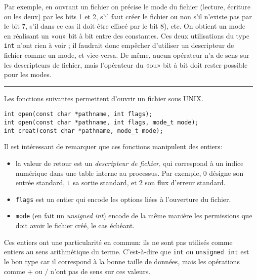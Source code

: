 \def\tBits{\textsc{Bits}\xspace}

Par exemple, en ouvrant un fichier on précise le mode du fichier (lecture,
écriture ou les deux) par les bits 1 et 2, s'il faut créer le fichier ou non
s'il n'existe pas par le bit 7, s'il dans ce cas il doit être effacé par le bit
8), etc. On obtient un mode en réalisant un «ou» bit à bit entre des
constantes. Ces deux utilisations du type \texttt{int} n'ont rien à voir ; il
faudrait donc empêcher d'utiliser un descripteur de fichier comme un mode, et
vice-versa. De même, aucun opérateur n'a de sens sur les descripteurs de
fichier, mais l'opérateur \texttt{\textbar{}} du «ou» bit à bit doit rester
possible pour les modes.

\begin{center}\rule{3in}{0.4pt}\end{center}

Les fonctions suivantes permettent d'ouvrir un fichier sous UNIX.

\begin{verbatim}
int open(const char *pathname, int flags);
int open(const char *pathname, int flags, mode_t mode);
int creat(const char *pathname, mode_t mode);
\end{verbatim}

Il est intéressant de remarquer que ces fonctions manipulent des entiers:

\begin{itemize}

\item la valeur de retour est un \emph{descripteur de fichier}, qui correspond à
un indice numérique dans une table interne au processus. Par exemple, $0$
désigne son entrée standard, $1$ sa sortie standard, et $2$ son flux d'erreur
standard.

\item \texttt{flags} est un entier qui encode les options liées à l'ouverture du
fichier.

\item \texttt{mode} (en fait un \emph{unsigned int}) encode de la même manière
les permissions que doit avoir le fichier créé, le cas échéant.

\end{itemize}

Ces entiers ont une particularité en commun: ils ne sont pas utilisés comme
entiers au sens arithmétique du terme. C'est-à-dire que \texttt{int} ou
\texttt{unsigned int} est le bon type car il correspond à la bonne taille de
données, mais les opérations comme $+$ ou $/$ n'ont pas de sens sur ces valeurs.

